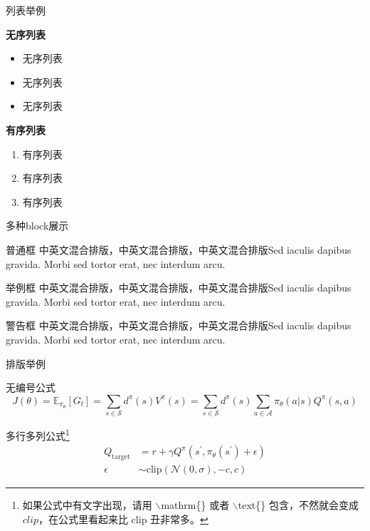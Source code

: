 \documentclass{beamer}
\begin{document}
\begin{frame}{列表举例}
	\begin{block}{\textbf{无序列表}}
		\begin{itemize}
			\item 无序列表
			\item 无序列表
			\item 无序列表
		\end{itemize}
	\end{block}
	
	\begin{block}{\textbf{有序列表}}
		\begin{enumerate}
			\item 有序列表
			\item 有序列表
			\item 有序列表
		\end{enumerate}
	\end{block}
\end{frame}

\begin{frame}{多种block展示}
	\begin{block}{普通框}
		中英文混合排版，中英文混合排版，中英文混合排版Sed iaculis
		dapibus gravida. Morbi sed tortor erat, nec interdum arcu. 
	\end{block}
	\begin{exampleblock}{举例框}
		中英文混合排版，中英文混合排版，中英文混合排版Sed iaculis
		dapibus gravida. Morbi sed tortor erat, nec interdum arcu.
	\end{exampleblock}
	\begin{alertblock}{警告框}
		中英文混合排版，中英文混合排版，中英文混合排版Sed iaculis
		dapibus gravida. Morbi sed tortor erat, nec interdum arcu.
	\end{alertblock}
\end{frame}

\begin{frame}{排版举例}
    \begin{exampleblock}{无编号公式} %
        \begin{equation*}
            J(\theta) = \mathbb{E}_{\pi_\theta}[G_t] = \sum_{s\in\mathcal{S}} d^\pi (s)V^\pi(s)=\sum_{s\in\mathcal{S}} d^\pi(s)\sum_{a\in\mathcal{A}}\pi_\theta(a|s)Q^\pi(s,a)
        \end{equation*}
    \end{exampleblock}
    \begin{exampleblock}{多行多列公式\footnote{如果公式中有文字出现，请用 $\backslash$mathrm\{\} 或者 $\backslash$text\{\} 包含，不然就会变成 $clip$，在公式里看起来比 $\mathrm{clip}$ 丑非常多。}}
        \begin{align}
            Q_\mathrm{target}&=r+\gamma Q^\pi(s^\prime, \pi_\theta(s^\prime)+\epsilon)\\
            \epsilon&\sim\mathrm{clip}(\mathcal{N}(0, \sigma), -c, c)\nonumber
        \end{align}
    \end{exampleblock}
\end{frame}
\end{document}
